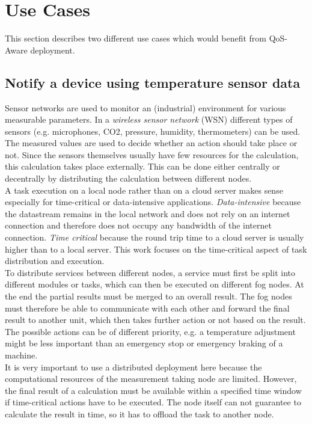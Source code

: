 \chapter{Use Cases\label{cha:use-cases}}

This section describes two different use cases which would benefit from QoS-Aware deployment.

\section{Notify a device using temperature sensor data\label{sec:sensordata}}

Sensor networks are used to monitor an (industrial) environment for various measurable parameters. In a \textit{wireless sensor network} (WSN) different types of sensors (e.g. microphones, CO2, pressure, humidity, thermometers) can be used. The measured values are used to decide whether an action should take place or not. Since the sensors themselves usually have few resources for the calculation, this calculation takes place externally. This can be done either centrally or decentrally by distributing the calculation between different nodes.\\

A task execution on a local node rather than on a cloud server makes sense especially for time-critical or data-intensive applications. \textit{Data-intensive} because the datastream remains in the local network and does not rely on an internet connection and therefore does not occupy any bandwidth of the internet connection. \textit{Time critical} because the round trip time to a cloud server is usually higher than to a local server. This work focuses on the time-critical aspect of task distribution and execution.\\

To distribute services between different nodes, a service must first be split into different modules or tasks, which can then be executed on different fog nodes. At the end the partial results must be merged to an overall result. The fog nodes must therefore be able to communicate with each other and forward the final result to another unit, which then takes further action or not based on the result. The possible actions can be of different priority, e.g. a temperature adjustment might be less important than an emergency stop or emergency braking of a machine.\\

It is very important to use a distributed deployment here because the computational resources of the measurement taking node are limited. However, the final result of a calculation must be available within a specified time window if time-critical actions have to be executed. The node itself can not guarantee to calculate the result in time, so it has to offload the task to another node.\\

